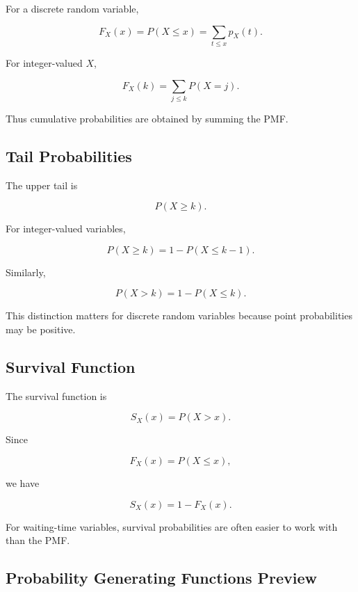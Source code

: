 For a discrete random variable,

\[
F_X(x)
=
P(X\leq x)
=
\sum_{t\leq x}p_X(t).
\]

For integer-valued \(X\),

\[
\boxed{
F_X(k)
=
\sum_{j\leq k}P(X=j).
}
\]

Thus cumulative probabilities are obtained by summing the PMF.

\subsection{Tail Probabilities}
\label{subsec:discrete-tail-probabilities}

The upper tail is

\[
P(X\geq k).
\]

For integer-valued variables,

\[
\boxed{
P(X\geq k)
=
1-P(X\leq k-1).
}
\]

Similarly,

\[
\boxed{
P(X>k)
=
1-P(X\leq k).
}
\]

This distinction matters for discrete random variables because point
probabilities may be positive.

\subsection{Survival Function}
\label{subsec:discrete-survival-function}

The survival function is

\[
\boxed{
S_X(x)
=
P(X>x).
}
\]

Since

\[
F_X(x)=P(X\leq x),
\]

we have

\[
\boxed{
S_X(x)
=
1-F_X(x).
}
\]

For waiting-time variables, survival probabilities are often easier to
work with than the PMF.

\subsection{Probability Generating Functions Preview}
\label{subsec:discrete-pgf-preview}

